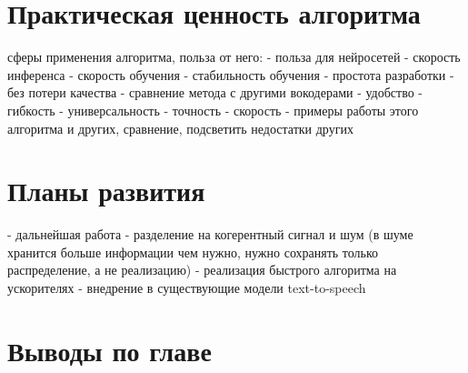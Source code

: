 \section{Практическая ценность алгоритма}
   сферы применения алгоритма, польза от него:
    - польза для нейросетей
      - скорость инференса
      - скорость обучения
      - стабильность обучения
      - простота разработки
      - без потери качества
  - сравнение метода с другими вокодерами
    - удобство
    - гибкость
    - универсальность
    - точность
    - скорость
  - примеры работы этого алгоритма и других, сравнение, подсветить недостатки других

\section{Планы развития}
 - дальнейшая работа
   - разделение на когерентный сигнал и шум (в шуме хранится больше информации чем нужно, нужно сохранять только распределение, а не реализацию)
   - реализация быстрого алгоритма на ускорителях
   - внедрение в существующие модели text-to-speech

\section{Выводы по главе}